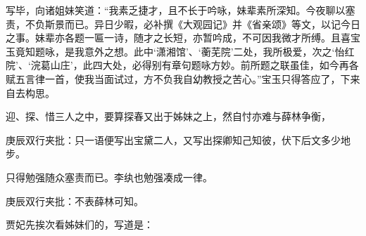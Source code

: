 \begin{parag}
    写毕，向诸姐妹笑道：“我素乏捷才，且不长于吟咏，妹辈素所深知。今夜聊以塞责，不负斯景而已。异日少暇，必补撰《大观园记》并《省亲颂》等文，以记今日之事。妹辈亦各题一匾一诗，随才之长短，亦暂吟成，不可因我微才所缚。且喜宝玉竟知题咏，是我意外之想。此中‘潇湘馆’、‘蘅芜院’二处，我所极爱，次之‘怡红院’、‘浣葛山庄’，此四大处，必得别有章句题咏方妙。前所题之联虽佳，如今再各赋五言律一首，使我当面试过，方不负我自幼教授之苦心。”宝玉只得答应了，下来自去构思。
\end{parag}


\begin{parag}
    迎、探、惜三人之中，要算探春又出于姊妹之上，然自忖亦难与薛林争衡，\begin{note}庚辰双行夹批：只一语便写出宝黛二人，又写出探卿知己知彼，伏下后文多少地步。\end{note}只得勉强随众塞责而已。李纨也勉强凑成一律。\begin{note}庚辰双行夹批：不表薛林可知。\end{note}贾妃先挨次看姊妹们的，写道是：
\end{parag}



